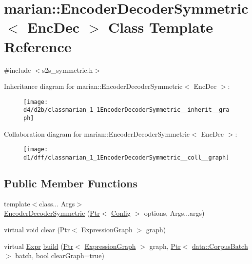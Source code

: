 \hypertarget{classmarian_1_1EncoderDecoderSymmetric}{}\section{marian\+:\+:Encoder\+Decoder\+Symmetric$<$ Enc\+Dec $>$ Class Template Reference}
\label{classmarian_1_1EncoderDecoderSymmetric}


{\ttfamily \#include $<$s2s\+\_\+symmetric.\+h$>$}



Inheritance diagram for marian\+:\+:Encoder\+Decoder\+Symmetric$<$ Enc\+Dec $>$\+:
\nopagebreak
\begin{figure}[H]
\begin{center}
\leavevmode
\texttt{[image: d4/d2b/classmarian\_1\_1EncoderDecoderSymmetric\_\_inherit\_\_graph]}
\end{center}
\end{figure}


Collaboration diagram for marian\+:\+:Encoder\+Decoder\+Symmetric$<$ Enc\+Dec $>$\+:
\nopagebreak
\begin{figure}[H]
\begin{center}
\leavevmode
\texttt{[image: d1/dff/classmarian\_1\_1EncoderDecoderSymmetric\_\_coll\_\_graph]}
\end{center}
\end{figure}
\subsection*{Public Member Functions}
\begin{DoxyCompactItemize}
\item 
{\footnotesize template$<$class... Args$>$ }\\\hyperlink{classmarian_1_1EncoderDecoderSymmetric_af23dd4332fe728e407575eebd65a81f2}{Encoder\+Decoder\+Symmetric} (\hyperlink{namespacemarian_ad1a373be43a00ef9ce35666145137b08}{Ptr}$<$ \hyperlink{classmarian_1_1Config}{Config} $>$ options, Args...\+args)
\item 
virtual void \hyperlink{classmarian_1_1EncoderDecoderSymmetric_a55892d5d085f60a4b33dd36acb4e80fa}{clear} (\hyperlink{namespacemarian_ad1a373be43a00ef9ce35666145137b08}{Ptr}$<$ \hyperlink{classmarian_1_1ExpressionGraph}{Expression\+Graph} $>$ graph)
\item 
virtual \hyperlink{namespacemarian_a498d8baf75b754011078b890b39c8e12}{Expr} \hyperlink{classmarian_1_1EncoderDecoderSymmetric_a82f58498cc49ba0665e0f8ef70876d65}{build} (\hyperlink{namespacemarian_ad1a373be43a00ef9ce35666145137b08}{Ptr}$<$ \hyperlink{classmarian_1_1ExpressionGraph}{Expression\+Graph} $>$ graph, \hyperlink{namespacemarian_ad1a373be43a00ef9ce35666145137b08}{Ptr}$<$ \hyperlink{classmarian_1_1data_1_1CorpusBatch}{data\+::\+Corpus\+Batch} $>$ batch, bool clear\+Graph=true)
\end{DoxyCompactItemize}
